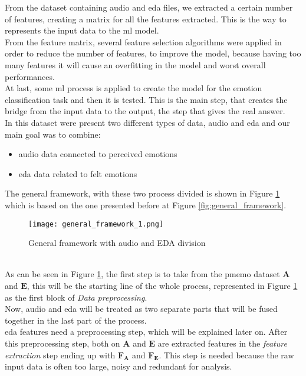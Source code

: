 From the dataset containing audio and \gls{eda} files, we extracted a certain number of features, creating a matrix for all the features extracted. This is the way to represents the input data to the \gls{ml} model.
\\
From the feature matrix, several feature selection algorithms were applied in order to reduce the number of features, to improve the model, because having too many features it will cause an overfitting in the model and worst overall performances.
\\
At last, some \gls{ml} process is applied to create the model for the emotion classification task and then it is tested. This is the main step, that creates the bridge from the input data to the output, the step that gives the real answer.
\\
In this dataset were present two different types of data, audio and \gls{eda} and our main goal was to combine:
\begin{itemize}
	\item audio data connected to perceived emotions
	\item \gls{eda} data related to felt emotions
\end{itemize}
The general framework, with these two process divided is shown in Figure \ref{fig:general_framework_1} which is based on the one presented before at Figure  \ref{fig:general_framework}.
\begin{figure}[h]
    \centering
    \texttt{[image: general\_framework\_1.png]} 
	\caption{General framework with audio and EDA division}
    \label{fig:general_framework_1}
\end{figure}
\\
As can be seen in Figure \ref{fig:general_framework_1}, the first step is to take from the \gls{pmemo} dataset $\textbf{A}$ and $\textbf{E}$, this will be the starting line of the whole process, represented in Figure \ref{fig:general_framework_1} as the first block of \textit{Data preprocessing}.
\\
Now, audio and \gls{eda} will be treated as two separate parts that will be fused together in the last part of the process.
\\
\gls{eda} features need a preprocessing step, which will be explained later on. After this preprocessing step, both on $\textbf{A}$ and $\textbf{E}$ are extracted features in the \textit{feature extraction} step ending up with $\textbf{F}_\textbf{A}$ and $\textbf{F}_\textbf{E}$. This step is needed because the raw input data is often too large, noisy and redundant for analysis.
